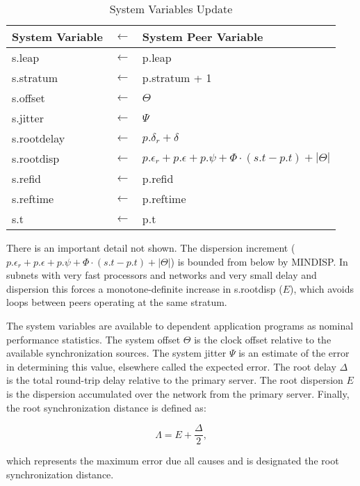 \begin{table}[htb]
\center
\begin{tabular}{| l c l |}
\hline
System Variable & $ \leftarrow $ & System Peer Variable \\
\hline
\hline
s.leap      & $ \leftarrow $ & p.leap                    \\
s.stratum   & $ \leftarrow $ & p.stratum + 1             \\
s.offset    & $ \leftarrow $ & $ \Theta $                     \\
s.jitter    & $ \leftarrow $ & $ \Psi $                       \\
s.rootdelay & $ \leftarrow $ & $ p.\delta_r + \delta $         \\
s.rootdisp  & $ \leftarrow $ & $ p.\epsilon_r + p.\epsilon + p.\psi + \Phi \cdot (s.t - p.t) + |\Theta| $ \\
s.refid     & $ \leftarrow $ & p.refid                   \\
s.reftime   & $ \leftarrow $ & p.reftime                 \\
s.t         & $ \leftarrow $ & p.t                       \\
\hline
\end{tabular}
\caption{System Variables Update}
\label{system_variables_update}
\end{table}

There is an important detail not shown. The dispersion increment
($ p.\epsilon_r + p.\epsilon + p.\psi + \Phi \cdot (s.t - p.t) + |\Theta| $) is bounded from
below by MINDISP. In subnets with very fast processors and networks
and very small delay and dispersion this forces a monotone-definite
increase in s.rootdisp ($ E $), which avoids loops between peers
operating at the same stratum.

The system variables are available to dependent application programs
as nominal performance statistics. The system offset $ \Theta $ is the
clock offset relative to the available synchronization sources. The
system jitter $ \Psi $ is an estimate of the error in determining this
value, elsewhere called the expected error. The root delay $ \Delta $ is
the total round-trip delay relative to the primary server. The root
dispersion $ E $ is the dispersion accumulated over the network
from the primary server. Finally, the root synchronization distance
is defined as:

$$
\Lambda = E + \frac{\Delta}{2},
$$

which represents the maximum error due all causes and is designated
the root synchronization distance.

